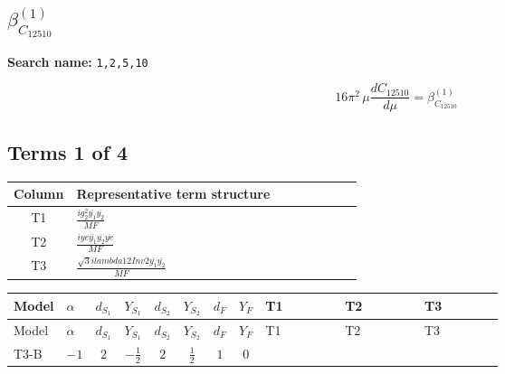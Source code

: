 \documentclass[8pt]{article}
\begin{document}
\begin{landscape}
\section*{$\beta_{C_{12510}}^{(1)}$}
\noindent\textbf{Search name: }\texttt{1,2,5,10}\par\smallskip
\[16\pi^2\,\mu\frac{d C_{12510}}{d\mu}=\beta_{C_{12510}}^{(1)}\]
\subsection*{Terms 1 of 4}
\begin{center}
\begin{tabular}{@{}c >{\raggedright\arraybackslash}p{0.82\linewidth}@{}}
\toprule
Column & Representative term structure \\
\midrule
T1 & \(\displaystyle \frac{i g_{2}^{2} \overline{y_{1}} \overline{y_{2}}}{MF}\) \\
\midrule
T2 & \(\displaystyle \frac{i ye \overline{y_{1}} \overline{y_{2}} \overline{ye}}{MF}\) \\
\midrule
T3 & \(\displaystyle \frac{\sqrt{3} i lambda12Inv2 \overline{y_{1}} \overline{y_{2}}}{MF}\) \\
\midrule
\bottomrule
\end{tabular}
\end{center}
\smallskip
\tiny
\begin{longtable}{@{}llcccccc >{\raggedright\arraybackslash}p{0.21\linewidth} >{\raggedright\arraybackslash}p{0.21\linewidth} >{\raggedright\arraybackslash}p{0.21\linewidth}@{}}
\toprule
Model & $\alpha$ & $d_{S_1}$ & $Y_{S_1}$ & $d_{S_2}$ & $Y_{S_2}$ & $d_F$ & $Y_F$ & T1 & T2 & T3 \\
\midrule
\endfirsthead
\toprule
Model & $\alpha$ & $d_{S_1}$ & $Y_{S_1}$ & $d_{S_2}$ & $Y_{S_2}$ & $d_F$ & $Y_F$ & T1 & T2 & T3 \\
\midrule
\endhead
T3-B & $-1$ & $2$ & $-\frac{1}{2}$ & $2$ & $\frac{1}{2}$ & $1$ & $0$ & \scriptsize\adjustbox{max width=\linewidth}{$\begin{gathered} \frac{3 i g_{2}^{2} \overline{y_{1}} \overline{y_{2}}}{8 MF}\end{gathered}$} & \scriptsize\adjustbox{max width=\linewidth}{$\begin{gathered} - \frac{i ye \overline{y_{1}} \overline{y_{2}} \overline{ye}}{8 MF}\end{gathered}$} & \scriptsize\adjustbox{max width=\linewidth}{$\begin{gathered} \frac{\sqrt{3} i lambda12Inv2 \overline{y_{1}} \overline{y_{2}}}{6 MF}\end{gathered}$} \\

\end{longtable}
\end{landscape}
\end{document}
